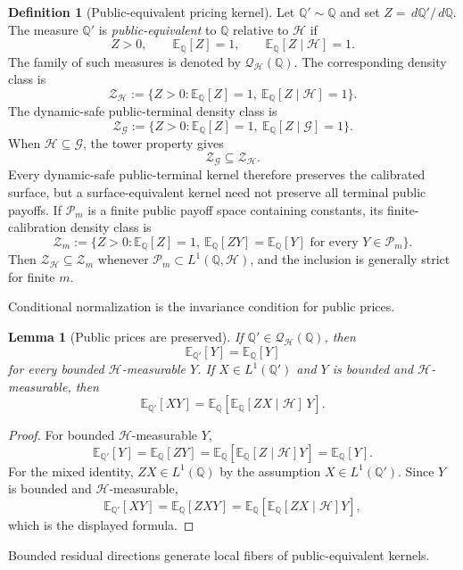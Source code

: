 \documentclass[11pt,a4paper]{amsart}
\theoremstyle{plain}
\newtheorem{lemma}[theorem]{Lemma}
\theoremstyle{definition}
\newtheorem{definition}[theorem]{Definition}
\theoremstyle{remark}
\newcommand{\QQ}{\mathbb{Q}}
\newcommand{\EE}{\mathbb{E}}
\newcommand{\cG}{\mathcal{G}}
\newcommand{\cH}{\mathcal{H}}
\newcommand{\cP}{\mathcal{P}}
\newcommand{\cQ}{\mathcal{Q}}
\newcommand{\cZ}{\mathcal{Z}}
\newcommand{\dd}{\,d}
\begin{document}
\begin{definition}[Public-equivalent pricing kernel]\label{def:public-equivalent}
Let \(\QQ'\sim\QQ\) and set \(Z=\dd\QQ'/\dd\QQ\).  The measure \(\QQ'\) is
\emph{public-equivalent} to \(\QQ\) relative to \(\cH\) if
\[
        Z>0,\qquad
        \EE_\QQ[Z]=1,\qquad
        \EE_\QQ[Z\mid\cH]=1.
\]
The family of such measures is denoted by \(\cQ_{\cH}(\QQ)\).
The corresponding density class is
\[
        \cZ_{\cH}
        :=
        \{Z>0:\EE_\QQ[Z]=1,\ \EE_\QQ[Z\mid\cH]=1\}.
\]
The dynamic-safe public-terminal density class is
\[
        \cZ_{\cG}
        :=
        \{Z>0:\EE_\QQ[Z]=1,\ \EE_\QQ[Z\mid\cG]=1\}.
\]
When \(\cH\subseteq\cG\), the tower property gives
\[
        \cZ_{\cG}\subseteq\cZ_{\cH}.
\]
Every dynamic-safe public-terminal kernel therefore preserves the calibrated surface, but a
surface-equivalent kernel need not preserve all terminal public payoffs.
If \(\cP_m\) is a finite public payoff space containing constants, its finite-calibration density
class is
\[
        \cZ_m
        :=
        \{Z>0:\EE_\QQ[Z]=1,\ \EE_\QQ[ZY]=\EE_\QQ[Y]\text{ for every }Y\in\cP_m\}.
\]
Then \(\cZ_{\cH}\subseteq\cZ_m\) whenever \(\cP_m\subset L^1(\QQ,\cH)\), and the inclusion is
generally strict for finite \(m\).
\end{definition}

Conditional normalization is the invariance condition for public prices.

\begin{lemma}[Public prices are preserved]\label{lem:public-preserved}
If \(\QQ'\in\cQ_{\cH}(\QQ)\), then
\[
        \EE_{\QQ'}[Y]=\EE_\QQ[Y]
\]
for every bounded \(\cH\)-measurable \(Y\).  If \(X\in L^1(\QQ')\) and \(Y\) is bounded and
\(\cH\)-measurable, then
\[
        \EE_{\QQ'}[XY]
        =
        \EE_\QQ\!\left[\EE_\QQ[ZX\mid\cH]\,Y\right].
\]
\end{lemma}

\begin{proof}
For bounded \(\cH\)-measurable \(Y\),
\[
        \EE_{\QQ'}[Y]
        =
        \EE_\QQ[ZY]
        =
        \EE_\QQ[\EE_\QQ[Z\mid\cH]Y]
        =
        \EE_\QQ[Y].
\]
For the mixed identity, \(ZX\in L^1(\QQ)\) by the assumption \(X\in L^1(\QQ')\).  Since
\(Y\) is bounded and \(\cH\)-measurable,
\[
        \EE_{\QQ'}[XY]
        =
        \EE_\QQ[ZXY]
        =
        \EE_\QQ\!\left[\EE_\QQ[ZX\mid\cH]Y\right],
\]
which is the displayed formula.
\end{proof}

Bounded residual directions generate local fibers of public-equivalent kernels.
\end{document}
